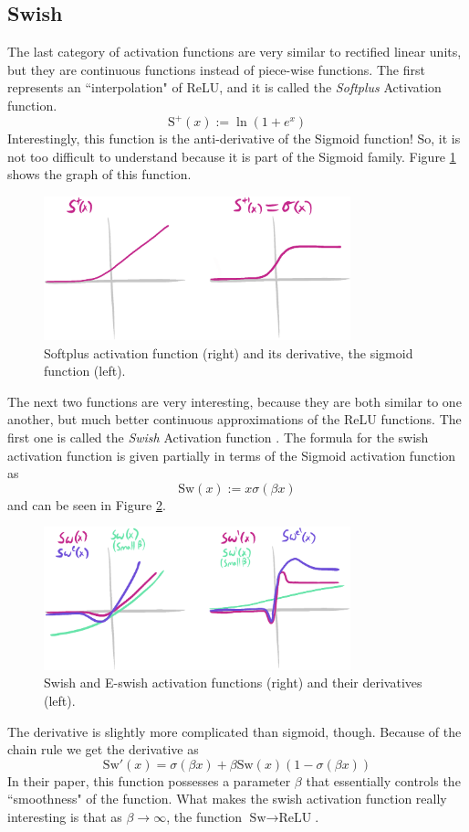 \documentclass[12pt]{report}
\begin{document}
\subsection{Swish}
The last category of activation functions are very similar to rectified linear units, but they are continuous functions instead of piece-wise functions. The first represents an ``interpolation" of ReLU, and it is called the \emph{Softplus} Activation function.
$$\text{S}^+(x) := \ln(1 + e^x)$$
Interestingly, this function is the anti-derivative of the Sigmoid function!
So, it is not too difficult to understand because it is part of the Sigmoid family.
Figure \ref{softplus} shows the graph of this function.
\begin{figure}[hbt!]
    \centering
    \includegraphics[width=3.5in]{figures/softplus.PNG}
    \caption{Softplus activation function (right) and its derivative, the sigmoid function (left).}
    \label{softplus}
\end{figure}

The next two functions are very interesting, because they are both similar to one another, but much better continuous approximations of the ReLU functions. The first one is called the \emph{Swish} Activation function \cite{ramachandran2017searching}. The formula for the swish activation function is given partially in terms of the Sigmoid activation function as
$$\text{Sw}(x) := x \sigma(\beta x)$$
and can be seen in Figure \ref{swish}.
\begin{figure}[hbt!]
    \centering
    \includegraphics[width=3.5in]{figures/swish.PNG}
    \caption{Swish and E-swish activation functions (right) and their derivatives (left).}
    \label{swish}
\end{figure}
The derivative is slightly more complicated than sigmoid, though. Because of the chain rule we get the derivative as 
$$\text{Sw}'(x) = \sigma(\beta x) + \beta \text{Sw}(x) (1 - \sigma(\beta x))$$
In their paper, this function possesses a parameter $\beta$ that essentially controls the ``smoothness" of the function. What makes the swish activation function really interesting is that as $\beta \rightarrow \infty$, the function $\text{Sw} \rightarrow \text{ReLU}$.
\end{document}
